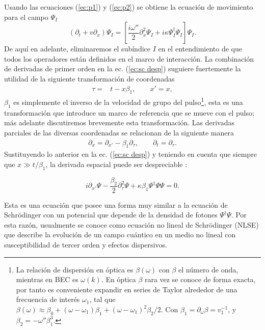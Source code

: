 Usando las ecuaciones (\ref{ec:p1}) y (\ref{ec:p2}) se obtiene la ecuaci\'{o}n de movimiento para el campo $\Psi_I$
\begin{equation}\label{ec:sc desp}
(\partial_t+v\partial_x)\Psi_I=\left[\frac{i\omega''}{2}\partial_x^2\Psi_I+i\kappa\Psi_I^{\dagger}\Psi_I\right]\Psi_I.
\end{equation} 
De aquí en adelante, eliminaremos el subíndice $I$ en el entendimiento de que todos los operadores est\'{a}n definidos en el marco de interacción. La combinación de derivadas de primer orden en la ec. (\ref{ec:sc desp}) suguiere fuertemente la utilidad de la siguiente transformación de coordenadas
\begin{align}\label{trans1}
\tau=&t-x \beta_1, \qquad x'=x,
\end{align}
 $\beta_1$ es simplemente el inverso de la velocidad de grupo del pulso\footnote{La relaci\'{o}n de dispersi\'{o}n en \'{o}ptica es $\beta(\omega)$ con $\beta$ el n\'{u}mero de onda, mientras en BEC es $\omega(k)$. En \'{o}ptica $\beta$ rara vez se conoce de forma exacta, por tanto es conveniente expandir en series de Taylor alrededor de una frecuencia de inter\'{e}s $\omega_1$, tal que $\beta(\omega)\approx\beta_0+(\omega-\omega_1)\beta_1+(\omega-\omega_1)^2\beta_2/2.$ Con $\beta_1=\partial_{\omega}\beta=v_1^{-1}$, y $\beta_2=-\omega''\beta_1^3$.}, esta es una transformación que introduce un marco de referencia que se mueve con el pulso; más adelante discutiremos brevemente esta transformaci\'{o}n. Las derivadas parciales de las diversas coordenadas se relacionan de la siguiente manera
 \begin{align}
 \partial_x=\partial_{x'}-\beta_1\partial_{\tau},\qquad
 \partial_t=\partial_{\tau}.
 \end{align}
Sustituyendo lo anterior en la ec. (\ref{ec:sc desp}) y teniendo en cuenta que  siempre que $x\gg t/\beta_1$, la derivada espacial puede ser despreciable \citep{drummond2014quantum}:
 
\begin{equation}\label{NLS}
i\partial_{x'}\Psi-\frac{\beta_2}{2}\partial_{\tau}^2\Psi+\kappa\beta_1\Psi^{\dagger}\Psi\Psi=0.
\end{equation}

Esta es una ecuaci\'{o}n que posee una forma muy similar a la ecuaci\'{o}n de Schr\"{o}dinger con un potencial que depende de la densidad de fotones $\Psi^{\dagger}\Psi$. Por esta raz\'{o}n, usualmente se conoce como ecuaci\'{o}n no lineal de Schr\"odinger (NLSE) que describe la evoluci\'{o}n de un campo cu\'{a}ntico en un medio no lineal  con susceptibilidad de tercer orden y efectos dispersivos.\\

